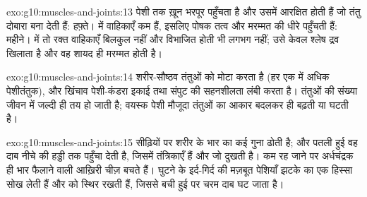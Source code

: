 \begin{solution}{exo:g10:muscles-and-joints:13}
पेशी तक ख़ून भरपूर पहुँचता है और उसमें आरक्षित  होती हैं जो तंतु
दोबारा बना देती हैं: हफ़्ते।  में वाहिकाएँ कम हैं, इसलिए पोषक
तत्व और मरम्मत की  धीरे पहुँचती हैं: महीने।  में तो रक्त
वाहिकाएँ बिलकुल नहीं और विभाजित होती  भी लगभग नहीं; उसे केवल
श्लेष द्रव खिलाता है और वह शायद ही मरम्मत होती है।
\end{solution}

\begin{solution}{exo:g10:muscles-and-joints:14}
शरीर-सौष्ठव तंतुओं को मोटा करता है (हर एक में अधिक पेशीतंतुक), और खिंचाव
पेशी-कंडरा इकाई तथा संपुट की सहनशीलता लंबी करता है। तंतुओं की संख्या जीवन
में जल्दी ही तय हो जाती है; वयस्क पेशी मौजूदा तंतुओं का आकार बदलकर ही
बढ़ती या घटती है।
\end{solution}

\begin{solution}{exo:g10:muscles-and-joints:15}
सीढ़ियों पर  शरीर के भार का कई गुना ढोती है; और पतली हुई  वह
दाब नीचे की हड्डी तक पहुँचा देती है, जिसमें तंत्रिकाएँ हैं और जो दुखती
है।  कम रह जाने पर अर्धचंद्रक ही भार फैलाने वाली आख़िरी चीज़ बचते
हैं। घुटने के इर्द-गिर्द की मज़बूत पेशियाँ झटके का एक हिस्सा सोख लेती हैं
और  को स्थिर रखती हैं, जिससे बची हुई  पर चरम दाब घट जाता है।
\end{solution}

